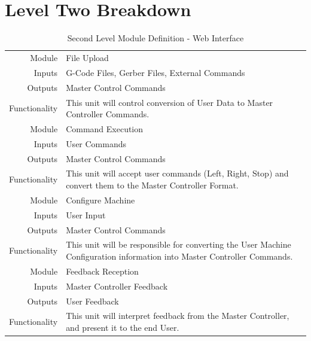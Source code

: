 \section{Level Two Breakdown}
\begin{table}[H] 
	\caption{Second Level Module Definition - Web Interface}
	\label{table:secondlevelweb}
	\centering 
	\begin{tabular}{|r p{10cm}|} 
		\hline\hline 
		Module		& File Upload \\ 
		Inputs		& G-Code Files, Gerber Files, External Commands	\\ 
		Outputs		& Master Control Commands \\ 
		Functionality	& This unit will control conversion of User Data to Master Controller Commands.\\ 
		\hline\hline 
		Module		& Command Execution \\ 
		Inputs		& User Commands	\\ 
		Outputs		& Master Control Commands \\ 
		Functionality	& This unit will accept user commands (Left, Right, Stop) and convert them to the Master Controller Format.\\
		\hline\hline 
		Module		& Configure Machine \\ 
		Inputs		& User Input \\ 
		Outputs		& Master Control Commands \\ 
		Functionality	& This unit will be responsible for converting the User Machine Configuration information into Master Controller Commands.\\
		\hline\hline 
		Module		& Feedback Reception \\ 
		Inputs		& Master Controller Feedback \\ 
		Outputs		& User Feedback \\ 
		Functionality	& This unit will interpret feedback from the Master Controller, and present it to the end User. \\
		\hline
		\end{tabular} 
\end{table}

